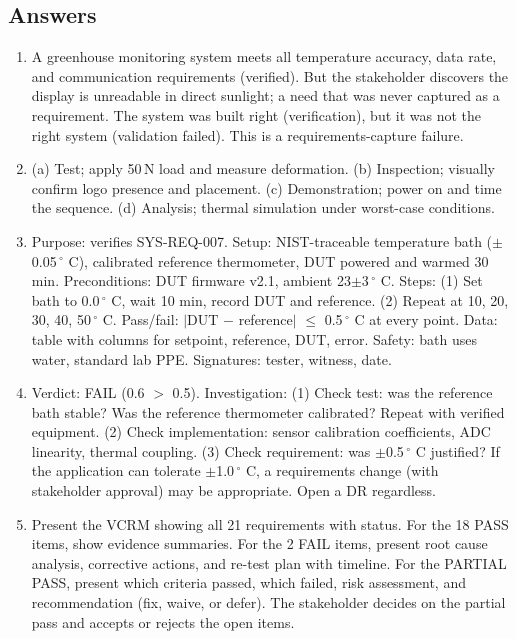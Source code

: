 \documentclass[11pt,letterpaper,twoside,openany]{book}
\begin{document}
\subsection{Answers}
\begin{enumerate}[leftmargin=1.5em]
\item A greenhouse monitoring system meets all temperature accuracy, data rate, and communication requirements (verified). But the stakeholder discovers the display is unreadable in direct sunlight; a need that was never captured as a requirement. The system was built right (verification), but it was not the right system (validation failed). This is a requirements-capture failure.
\item (a) Test; apply 50\,N load and measure deformation. (b) Inspection; visually confirm logo presence and placement. (c) Demonstration; power on and time the sequence. (d) Analysis; thermal simulation under worst-case conditions.
\item Purpose: verifies SYS-REQ-007. Setup: NIST-traceable temperature bath ($\pm$0.05\,$^{\circ}$ C), calibrated reference thermometer, DUT powered and warmed 30 min. Preconditions: DUT firmware v2.1, ambient 23$\pm$3\,$^{\circ}$ C. Steps: (1) Set bath to 0.0\,$^{\circ}$ C, wait 10 min, record DUT and reference. (2) Repeat at 10, 20, 30, 40, 50\,$^{\circ}$ C. Pass/fail: $|$DUT $-$ reference$|$ $\leq$ 0.5\,$^{\circ}$ C at every point. Data: table with columns for setpoint, reference, DUT, error. Safety: bath uses water, standard lab PPE. Signatures: tester, witness, date.
\item Verdict: FAIL (0.6 $>$ 0.5). Investigation: (1) Check test: was the reference bath stable? Was the reference thermometer calibrated? Repeat with verified equipment. (2) Check implementation: sensor calibration coefficients, ADC linearity, thermal coupling. (3) Check requirement: was $\pm$0.5\,$^{\circ}$ C justified? If the application can tolerate $\pm$1.0\,$^{\circ}$ C, a requirements change (with stakeholder approval) may be appropriate. Open a DR regardless.
\item Present the VCRM showing all 21 requirements with status. For the 18 PASS items, show evidence summaries. For the 2 FAIL items, present root cause analysis, corrective actions, and re-test plan with timeline. For the PARTIAL PASS, present which criteria passed, which failed, risk assessment, and recommendation (fix, waive, or defer). The stakeholder decides on the partial pass and accepts or rejects the open items.
\end{enumerate}
\end{document}
